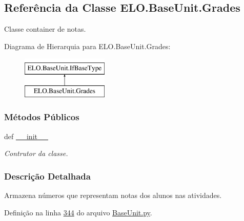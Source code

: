\hypertarget{classELO_1_1BaseUnit_1_1Grades}{\subsection{Referência da Classe E\-L\-O.\-Base\-Unit.\-Grades}
\label{classELO_1_1BaseUnit_1_1Grades}
}


Classe container de notas.  


Diagrama de Hierarquia para E\-L\-O.\-Base\-Unit.\-Grades\-:\begin{figure}[H]
\begin{center}
\leavevmode
\includegraphics[height=2.000000cm]{dc/d3a/classELO_1_1BaseUnit_1_1Grades}
\end{center}
\end{figure}
\subsubsection*{Métodos Públicos}
\begin{DoxyCompactItemize}
\item 
def \hyperlink{classELO_1_1BaseUnit_1_1Grades_af948e06e9c08a7d99da82eae5f851839}{\-\_\-\-\_\-init\-\_\-\-\_\-}
\begin{DoxyCompactList}\small\item\em Contrutor da classe. \end{DoxyCompactList}\end{DoxyCompactItemize}


\subsubsection{Descrição Detalhada}
Armazena números que representam notas dos alunos nas atividades. 

Definição na linha \hyperlink{BaseUnit_8py_source_l00344}{344} do arquivo \hyperlink{BaseUnit_8py_source}{Base\-Unit.\-py}.



